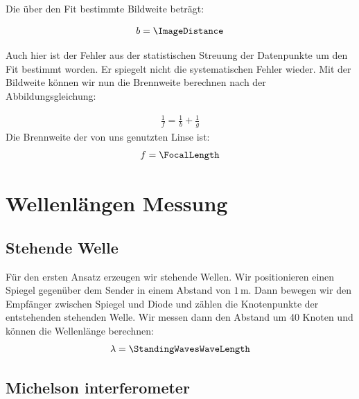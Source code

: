 \documentclass[a4paper,10pt,twocolumn]{article}
\begin{document}
    
    Die über den Fit bestimmte Bildweite beträgt:
    
    \begin{align*}
        b = \ImageDistance
    \end{align*}

    Auch hier ist der Fehler aus der statistischen Streuung der Datenpunkte um den Fit bestimmt worden.
    Er spiegelt nicht die systematischen Fehler wieder.
    Mit der Bildweite können wir nun die Brennweite berechnen nach der Abbildungsgleichung:
    
    \begin{align}
        \label{eq:LensFormula}
        \frac{1}{f} = \frac{1}{b} + \frac{1}{g}
    \end{align}
    Die Brennweite der von uns genutzten Linse ist:
    \begin{align*}
        f = \FocalLength
    \end{align*}
    
    \section{Wellenlängen Messung}
    \subsection{Stehende Welle}
    
    
    
    Für den ersten Ansatz erzeugen wir stehende Wellen. 
    Wir positionieren einen Spiegel gegenüber dem Sender in einem Abstand von $1\, \mathrm{m}$. 
    Dann bewegen wir den Empfänger zwischen Spiegel und Diode und zählen die Knotenpunkte der entstehenden stehenden Welle. 
    Wir messen dann den Abstand um 40 Knoten und können die Wellenlänge berechnen:
    \begin{align*}
        \lambda = \StandingWavesWaveLength
    \end{align*}
    \subsection{Michelson interferometer}
\end{document}
